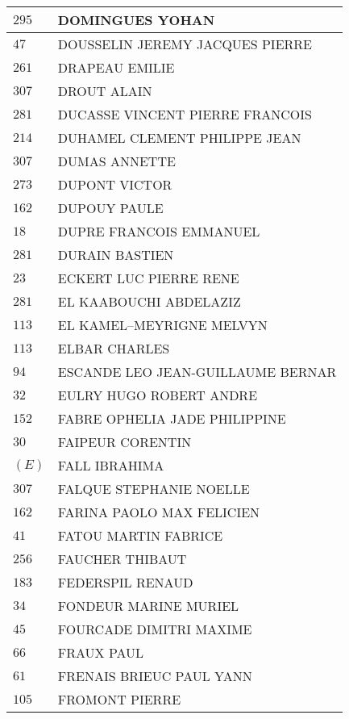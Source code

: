 \begin{xltabular}{\linewidth}{|l|X|}
    \hline
    $295$ & DOMINGUES YOHAN \\
    \hline
    $47$ & DOUSSELIN JEREMY JACQUES PIERRE \\
    \hline
    $261$ & DRAPEAU EMILIE \\
    \hline
    $307$ & DROUT ALAIN \\
    \hline
    $281$ & DUCASSE VINCENT PIERRE FRANCOIS \\
    \hline
    $214$ & DUHAMEL CLEMENT PHILIPPE JEAN \\
    \hline
    $307$ & DUMAS ANNETTE \\
    \hline
    $273$ & DUPONT VICTOR \\
    \hline
    $162$ & DUPOUY PAULE \\
    \hline
    $18$ & DUPRE FRANCOIS EMMANUEL \\
    \hline
    $281$ & DURAIN BASTIEN \\
    \hline
    $23$ & ECKERT LUC PIERRE RENE \\
    \hline
    $281$ & EL KAABOUCHI ABDELAZIZ \\
    \hline
    $113$ & EL KAMEL--MEYRIGNE MELVYN \\
    \hline
    $113$ & ELBAR CHARLES \\
    \hline
    $94$ & ESCANDE LEO JEAN-GUILLAUME BERNAR \\
    \hline
    $32$ & EULRY HUGO ROBERT ANDRE \\
    \hline
    $152$ & FABRE OPHELIA JADE PHILIPPINE \\
    \hline
    $30$ & FAIPEUR CORENTIN \\
    \hline
    $(E)$ & FALL IBRAHIMA \\
    \hline
    $307$ & FALQUE STEPHANIE NOELLE \\
    \hline
    $162$ & FARINA PAOLO MAX FELICIEN \\
    \hline
    $41$ & FATOU MARTIN FABRICE \\
    \hline
    $256$ & FAUCHER THIBAUT \\
    \hline
    $183$ & FEDERSPIL RENAUD \\
    \hline
    $34$ & FONDEUR MARINE MURIEL \\
    \hline
    $45$ & FOURCADE DIMITRI MAXIME \\
    \hline
    $66$ & FRAUX PAUL \\
    \hline
    $61$ & FRENAIS BRIEUC PAUL YANN \\
    \hline
    $105$ & FROMONT PIERRE \\
    \hline

\end{xltabular}

